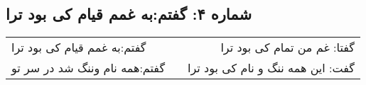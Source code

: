 \begin{center}
\section*{شماره ۴: گفتم:‌به غمم قیام کی بود ترا}
\label{sec:004}
\begin{longtable}{l p{0.5cm} r}
گفتم:‌به غمم قیام کی بود ترا
&&
گفتا: غم من تمام کی بود ترا
\\
گفتم‌:همه نام وننگ شد در سر تو
&&
گفت: این همه ننگ و نام کی بود ترا
\\
\end{longtable}
\end{center}
